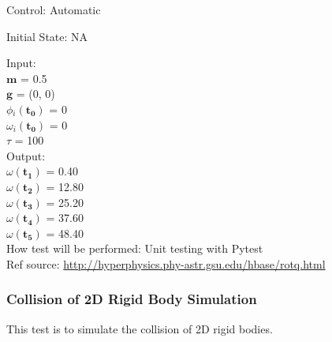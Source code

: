 \documentclass[12pt, titlepage]{article}
\begin{document}
\begin{enumerate}
Control: Automatic

Initial State: NA

Input:\\
\hspace*{1.3cm}$\mathbf{m}$$\mathbf{}$ = 0.5\\
\hspace*{1.3cm}$\mathbf{g}$$\mathbf{}$ = (0, 0)\\
\hspace*{1.3cm}$\phi$$_i\mathbf{(t_0)}$ = 0\\
\hspace*{1.3cm}$\omega$$_i\mathbf{(t_0)}$ = 0\\
\hspace*{1.3cm}$\tau$$\mathbf{}$ = 100 \\

Output:\\
$\omega$$\mathbf{(t_1)}$ = 0.40\\
$\omega$$\mathbf{(t_2)}$ = 12.80\\
$\omega$$\mathbf{(t_3)}$ = 25.20\\
$\omega$$\mathbf{(t_4)}$ = 37.60\\
$\omega$$\mathbf{(t_5)}$ = 48.40\\


How test will be performed: Unit testing with Pytest\\
Ref source: \url{http://hyperphysics.phy-astr.gsu.edu/hbase/rotq.html}
\end{enumerate}


\subsubsection{Collision of 2D Rigid Body Simulation}
This test is to simulate the collision of 2D rigid bodies.
\end{document}
